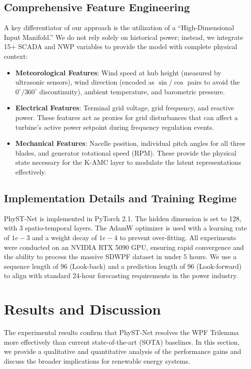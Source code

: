 \subsection{Comprehensive Feature Engineering}
\label{sec:features}
A key differentiator of our approach is the utilization of a ``High-Dimensional Input Manifold.'' We do not rely solely on historical power; instead, we integrate 15+ SCADA and NWP variables to provide the model with complete physical context:
\begin{itemize}
    \item \textbf{Meteorological Features}: Wind speed at hub height (measured by ultrasonic sensors), wind direction (encoded as $\sin/\cos$ pairs to avoid the $0^\circ/360^\circ$ discontinuity), ambient temperature, and barometric pressure.
    \item \textbf{Electrical Features}: Terminal grid voltage, grid frequency, and reactive power. These features act as proxies for grid disturbances that can affect a turbine's active power setpoint during frequency regulation events.
    \item \textbf{Mechanical Features}: Nacelle position, individual pitch angles for all three blades, and generator rotational speed (RPM). These provide the physical state necessary for the K-AMC layer to modulate the latent representations effectively.
\end{itemize}

\subsection{Implementation Details and Training Regime}
\label{sec:implementation}
PhyST-Net is implemented in PyTorch 2.1. The hidden dimension is set to 128, with 3 spatio-temporal layers. The AdamW optimizer is used with a learning rate of $1e-3$ and a weight decay of $1e-4$ to prevent over-fitting. All experiments were conducted on an NVIDIA RTX 5090 GPU, ensuring rapid convergence and the ability to process the massive SDWPF dataset in under 5 hours. We use a sequence length of 96 (Look-back) and a prediction length of 96 (Look-forward) to align with standard 24-hour forecasting requirements in the power industry.

\section{Results and Discussion}
\label{sec:results}
The experimental results confirm that PhyST-Net resolves the WPF Trilemma more effectively than current state-of-the-art (SOTA) baselines. In this section, we provide a qualitative and quantitative analysis of the performance gains and discuss the broader implications for renewable energy systems.


